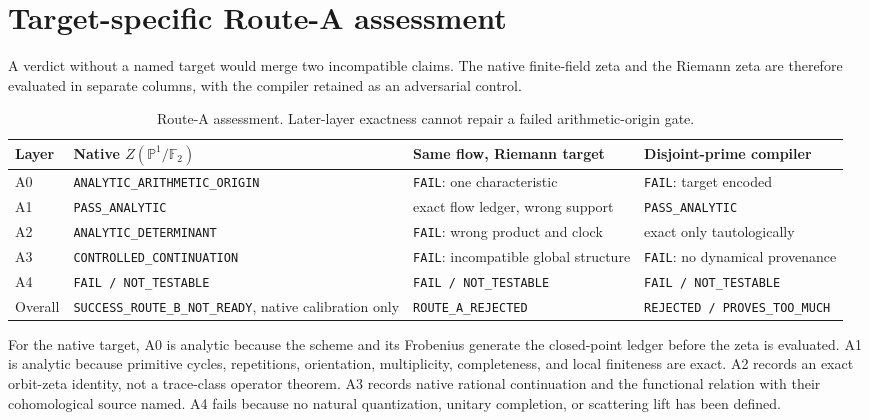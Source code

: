 \documentclass[11pt]{article}
\theoremstyle{definition}
\theoremstyle{remark}
\newcommand{\F}{\mathbb{F}}
\begin{document}
\section{Target-specific Route-A assessment}
\label{sec:route}

A verdict without a named target would merge two incompatible claims.  The
native finite-field zeta and the Riemann zeta are therefore evaluated in
separate columns, with the compiler retained as an adversarial control.

\begin{table}[t]
\centering
\caption{Route-A assessment.  Later-layer exactness cannot repair a failed
arithmetic-origin gate.}
\label{tab:route}
\small
\begin{tabularx}{\textwidth}{@{}L{0.075\textwidth}YYY@{}}
\toprule
Layer & Native \(Z(\mathbb P^1/\F_2)\) & Same flow, Riemann target & Disjoint-prime compiler\\
\midrule
A0 & \texttt{ANALYTIC\_\allowbreak ARITHMETIC\_\allowbreak ORIGIN} & \texttt{FAIL}: one characteristic & \texttt{FAIL}: target encoded\\
A1 & \texttt{PASS\_ANALYTIC} & exact flow ledger, wrong support & \texttt{PASS\_ANALYTIC}\\
A2 & \texttt{ANALYTIC\_DETERMINANT} & \texttt{FAIL}: wrong product and clock & exact only tautologically\\
A3 & \texttt{CONTROLLED\_CONTINUATION} & \texttt{FAIL}: incompatible global structure & \texttt{FAIL}: no dynamical provenance\\
A4 & \texttt{FAIL / NOT\_TESTABLE} & \texttt{FAIL / NOT\_TESTABLE} & \texttt{FAIL / NOT\_TESTABLE}\\
Overall & \texttt{SUCCESS\_\allowbreak ROUTE\_B\_\allowbreak NOT\_READY}, native calibration only & \texttt{ROUTE\_A\_\allowbreak REJECTED} & \texttt{REJECTED / \allowbreak PROVES\_TOO\_MUCH}\\
\bottomrule
\end{tabularx}
\end{table}

For the native target, A0 is analytic because the scheme and its Frobenius
generate the closed-point ledger before the zeta is evaluated.  A1 is analytic
because primitive cycles, repetitions, orientation, multiplicity,
completeness, and local finiteness are exact.  A2 records an exact
orbit-zeta identity, not a trace-class operator theorem.  A3 records native
rational continuation and the functional relation with their cohomological
source named.  A4 fails because no natural quantization, unitary completion,
or scattering lift has been defined.
\end{document}
